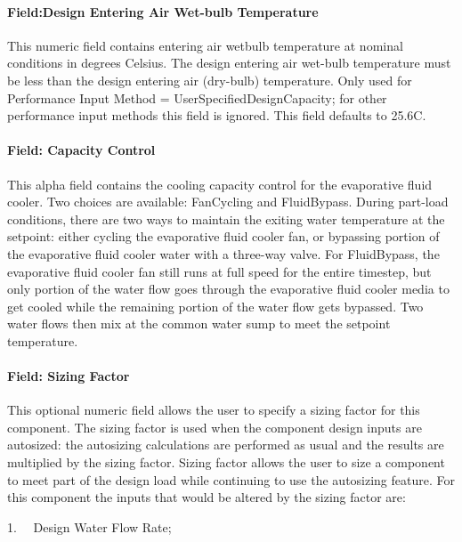 \paragraph{Field:Design Entering Air Wet-bulb Temperature}\label{fielddesign-entering-air-wet-bulb-temperature}

This numeric field contains entering air wetbulb temperature at nominal conditions in degrees Celsius. The design entering air wet-bulb temperature must be less than the design entering air (dry-bulb) temperature. Only used for Performance Input Method = UserSpecifiedDesignCapacity; for other performance input methods this field is ignored. This field defaults to 25.6C.

\paragraph{Field: Capacity Control}\label{field-capacity-control}

This alpha field contains the cooling capacity control for the evaporative fluid cooler. Two choices are available: FanCycling and FluidBypass. During part-load conditions, there are two ways to maintain the exiting water temperature at the setpoint: either cycling the evaporative fluid cooler fan, or bypassing portion of the evaporative fluid cooler water with a three-way valve. For FluidBypass, the evaporative fluid cooler fan still runs at full speed for the entire timestep, but only portion of the water flow goes through the evaporative fluid cooler media to get cooled while the remaining portion of the water flow gets bypassed. Two water flows then mix at the common water sump to meet the setpoint temperature.

\paragraph{Field: Sizing Factor}\label{field-sizing-factor-3}

This optional numeric field allows the user to specify a sizing factor for this component. The sizing factor is used when the component design inputs are autosized: the autosizing calculations are performed as usual and the results are multiplied by the sizing factor. Sizing factor allows the user to size a component to meet part of the design load while continuing to use the autosizing feature. For this component the inputs that would be altered by the sizing factor are:

1.~~ Design Water Flow Rate;

